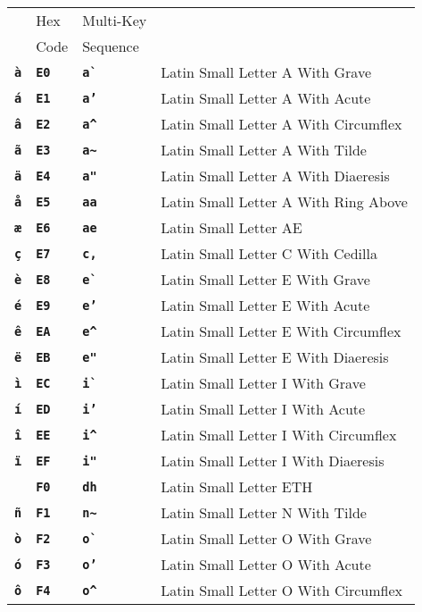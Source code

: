 \documentclass[12pt]{article}
\newcommand{\TT}[1]{{\tt \bfseries #1}}
\newlength{\figurewidth}
\newenvironment{boxedfigure}[1][!btp]%
	{\begin{figure*}[#1]
	 \begin{lrbox}{\figurebox}
	 \begin{minipage}{\figurewidth}

	 \vspace*{1ex}}%
	{
	 \vspace*{1ex}

	 \end{minipage}
	 \end{lrbox}

	 \vspace*{-15ex}
	 \centering
	 \fbox{\hspace*{0.1in}\usebox{\figurebox}\hspace*{0.1in}}
	 \end{figure*}}
\begin{document}
\begin{boxedfigure}
\begin{tabular}{llll}
& Hex & Multi-Key \\
& Code & Sequence
\\[1ex]
\TT{\`a}
  & \TT{E0} & \TT{a\`~} & Latin Small Letter A With Grave \\
\TT{\'a}
  & \TT{E1} & \TT{a'} & Latin Small Letter A With Acute \\
\TT{\^a}
  & \TT{E2} & \TT{a\textasciicircum} & Latin Small Letter A With Circumflex \\
\TT{\~a}
  & \TT{E3} & \TT{a\textasciitilde} & Latin Small Letter A With Tilde \\
\TT{\"a}
  & \TT{E4} & \TT{a"} & Latin Small Letter A With Diaeresis \\
\TT{\aa}
  & \TT{E5} & \TT{aa} & Latin Small Letter A With Ring Above \\
\TT{\ae}
  & \TT{E6} & \TT{ae} & Latin Small Letter AE \\
\TT{\c{c}}
  & \TT{E7} & \TT{c,} & Latin Small Letter C With Cedilla \\
\TT{\`e}
  & \TT{E8} & \TT{e\`~} & Latin Small Letter E With Grave \\
\TT{\'e}
  & \TT{E9} & \TT{e'} & Latin Small Letter E With Acute \\
\TT{\^e}
  & \TT{EA} & \TT{e\textasciicircum} & Latin Small Letter E With Circumflex \\
\TT{\"e}
  & \TT{EB} & \TT{e"} & Latin Small Letter E With Diaeresis \\
\TT{\`{\i}}
  & \TT{EC} & \TT{i\`~} & Latin Small Letter I With Grave \\
\TT{\'{\i}}
  & \TT{ED} & \TT{i'} & Latin Small Letter I With Acute \\
\TT{\^{\i}}
  & \TT{EE} & \TT{i\textasciicircum} & Latin Small Letter I With Circumflex \\
\TT{\"{\i}}
  & \TT{EF} & \TT{i"} & Latin Small Letter I With Diaeresis \\
\TT{\dh}
  & \TT{F0} & \TT{dh} & Latin Small Letter ETH \\
\TT{\~n}
  & \TT{F1} & \TT{n\textasciitilde} & Latin Small Letter N With Tilde \\
\TT{\`o}
  & \TT{F2} & \TT{o\`~} & Latin Small Letter O With Grave \\
\TT{\'o}
  & \TT{F3} & \TT{o'} & Latin Small Letter O With Acute \\
\TT{\^o}
  & \TT{F4} & \TT{o\textasciicircum} & Latin Small Letter O With Circumflex \\

\end{tabular}
\end{boxedfigure}
\end{document}
